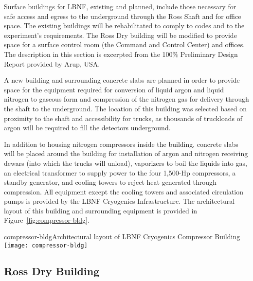 Surface buildings for LBNF, existing and planned, include those necessary for safe access and egress to the underground through the Ross Shaft and for office space. The existing buildings will be rehabilitated to comply to codes and to the experiment's requirements. 
The Ross Dry building will be modified to provide space for a surface control room (the Command and Control Center) and offices. The description in this section is excerpted from the 100\% Preliminary Design Report  provided by Arup, USA.

A new building and surrounding concrete slabs are planned in order to provide space for the equipment required for %
conversion of liquid argon and liquid nitrogen to gaseous form and compression of the nitrogen gas for delivery through the shaft to the underground. %
The location of this building was selected based on proximity to the shaft and  accessibility for trucks, as thousands of truckloads of argon will be required to fill the detectors underground.

In addition to housing nitrogen compressors inside the building, concrete slabs %
will be placed around the building %
for installation of argon and nitrogen receiving dewars (into which the trucks will unload), vaporizers to boil the liquids into gas, an electrical transformer to supply power to the four 1,500-Hp compressors, a standby generator, and cooling towers to reject heat generated through compression. All equipment except the cooling towers and associated circulation pumps is provided by the LBNF Cryogenics Infrastructure. The architectural layout of this building and surrounding equipment is provided in Figure~\ref{fig:compressor-bldg}. 

\begin{cdrfigure}{compressor-bldg}{Architectural layout of LBNF Cryogenics Compressor Building}
\texttt{[image: compressor-bldg]}
\end{cdrfigure}


\subsection{Ross Dry Building}
\label{sec:fscf-surf-facil-surface-bldg-rossdry}

